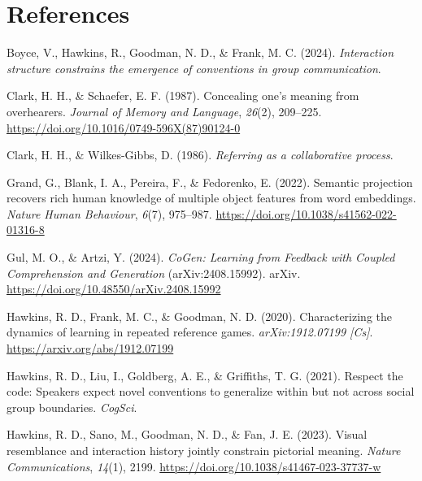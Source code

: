\documentclass[10pt, letterpaper]{article}
\begin{document}
\section{References}\label{references}

\setlength{\parindent}{-0.1in} 
\setlength{\leftskip}{0.125in}

\noindent

\label{refs}
\begin{CSLReferences}{1}{0}
Boyce, V., Hawkins, R., Goodman, N. D., \& Frank, M. C. (2024).
\emph{Interaction structure constrains the emergence of conventions in
group communication}.

Clark, H. H., \& Schaefer, E. F. (1987). Concealing one's meaning from
overhearers. \emph{Journal of Memory and Language}, \emph{26}(2),
209--225. \url{https://doi.org/10.1016/0749-596X(87)90124-0}

Clark, H. H., \& Wilkes-Gibbs, D. (1986). \emph{Referring as a
collaborative process}.

Grand, G., Blank, I. A., Pereira, F., \& Fedorenko, E. (2022). Semantic
projection recovers rich human knowledge of multiple object features
from word embeddings. \emph{Nature Human Behaviour}, \emph{6}(7),
975--987. \url{https://doi.org/10.1038/s41562-022-01316-8}

Gul, M. O., \& Artzi, Y. (2024). \emph{{CoGen}: {Learning} from
{Feedback} with {Coupled Comprehension} and {Generation}}
(arXiv:2408.15992). arXiv.
\url{https://doi.org/10.48550/arXiv.2408.15992}

Hawkins, R. D., Frank, M. C., \& Goodman, N. D. (2020). Characterizing
the dynamics of learning in repeated reference games.
\emph{arXiv:1912.07199 {[}Cs{]}}. \url{https://arxiv.org/abs/1912.07199}

Hawkins, R. D., Liu, I., Goldberg, A. E., \& Griffiths, T. G. (2021).
Respect the code: {Speakers} expect novel conventions to generalize
within but not across social group boundaries. \emph{CogSci}.

Hawkins, R. D., Sano, M., Goodman, N. D., \& Fan, J. E. (2023). Visual
resemblance and interaction history jointly constrain pictorial meaning.
\emph{Nature Communications}, \emph{14}(1), 2199.
\url{https://doi.org/10.1038/s41467-023-37737-w}


\end{CSLReferences}
\end{document}
